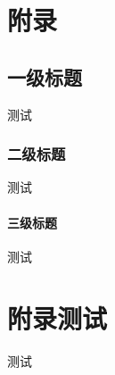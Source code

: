 \documentclass[forprint]{YAUthesis}
\begin{document}

\appendix

\chapter{附录}

\section{一级标题}
测试
\subsection{二级标题}
测试
\subsubsection{三级标题}
测试


\chapter{附录测试}

测试



\cleardoublepage
\end{document}
